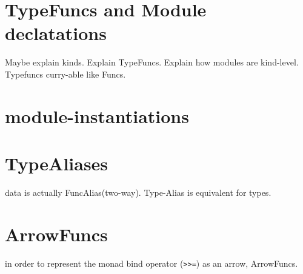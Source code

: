 \section{TypeFuncs and Module declatations}
\begin{multicols}{2}
\columnbreak
Maybe explain kinds.
Explain TypeFuncs.
Explain how modules are kind-level.
Typefuncs curry-able like Funcs.
\end{multicols}

\section{module-instantiations}
\section{TypeAliases}
data is actually FuncAlias(two-way). Type-Alias is equivalent for types.

\section{ArrowFuncs}
in order to represent the monad bind operator (\texttt{>>=}) as an arrow, ArrowFuncs.
